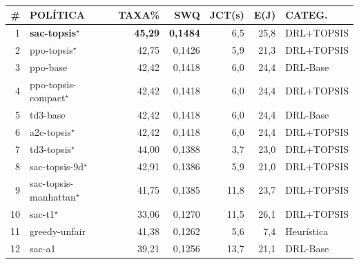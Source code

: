 \documentclass{beamer}
\begin{document}
{
\begin{frame}[plain, t]
\color{black}

\vspace{0.35cm}
\hspace{0.3cm}{\Large\bfseries\ttfamily AVALIAÇÃO COMPARATIVA — POSIÇÕES 1–12}\\[2pt]
\hspace{0.3cm}{\scriptsize\ttfamily 658 CENÁRIOS V2X $\bullet$ ORDENADO POR SWQ DECRESCENTE $\bullet$ $\star$ = USA TOPSIS}\\[3pt]
\\[2pt]

\vspace{0.08cm}
\hspace{0.3cm}
{\tiny\ttfamily
\begin{tabular}{rlrrrrl}
\hline
\textbf{\#} & \textbf{POLÍTICA} & \textbf{TAXA\%} & \textbf{SWQ} & \textbf{JCT(s)} & \textbf{E(J)} & \textbf{CATEG.} \\
\hline
 1 & \textbf{sac-topsis}$^\star$ & \textbf{45,29} & \textbf{0,1484} &  6,5 & 25,8 & DRL+TOPSIS \\
 2 & ppo-topsis$^\star$          & 42,75 & 0,1426 &  5,9 & 21,3 & DRL+TOPSIS \\
 3 & ppo-base                    & 42,42 & 0,1418 &  6,0 & 24,4 & DRL-Base   \\
 4 & ppo-topsis-compact$^\star$  & 42,42 & 0,1418 &  6,0 & 24,4 & DRL+TOPSIS \\
 5 & td3-base                    & 42,42 & 0,1418 &  6,0 & 24,4 & DRL-Base   \\
 6 & a2c-topsis$^\star$          & 42,42 & 0,1418 &  6,0 & 24,4 & DRL+TOPSIS \\
 7 & td3-topsis$^\star$          & 44,00 & 0,1388 &  3,7 & 23,0 & DRL+TOPSIS \\
 8 & sac-topsis-9d$^\star$       & 42,91 & 0,1386 &  5,9 & 21,0 & DRL+TOPSIS \\
 9 & sac-topsis-manhattan$^\star$& 41,75 & 0,1385 & 11,8 & 23,7 & DRL+TOPSIS \\
10 & sac-t1$^\star$              & 33,06 & 0,1270 & 11,5 & 26,1 & DRL+TOPSIS \\
11 & greedy-unfair               & 41,38 & 0,1262 &  5,6 &  7,4 & Heurística\\
12 & sac-a1                      & 39,21 & 0,1256 & 13,7 & 21,1 & DRL-Base   \\
\hline
\end{tabular}}


\end{frame}}
\end{document}
